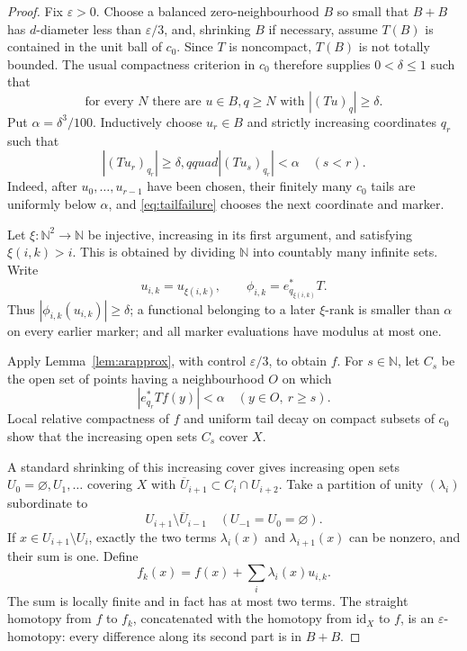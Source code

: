 \documentclass[11pt]{article}
\newcommand{\N}{\mathbb N}
\newcommand{\id}{\mathrm{id}}
\begin{document}
\begin{proof}
Fix $\varepsilon>0$.  Choose a balanced zero-neighbourhood $B$ so small that
$B+B$ has $d$-diameter less than $\varepsilon/3$, and, shrinking $B$ if
necessary, assume $T(B)$ is contained in the unit ball of $c_0$.  Since $T$
is noncompact, $T(B)$ is not totally bounded.  The usual compactness
criterion in $c_0$ therefore supplies $0<\delta\le1$ such that
\begin{equation}\label{eq:tailfailure}
 \text{for every }N\text{ there are }u\in B, q\ge N
 \text{ with } |(Tu)_q|\ge\delta.
\end{equation}
Put $\alpha=\delta^3/100$.  Inductively choose $u_r\in B$ and strictly
increasing coordinates $q_r$ such that
\begin{equation}\label{eq:markers}
 |(Tu_r)_{q_r}|\ge\delta,qquad
 |(Tu_s)_{q_r}|<\alpha\quad(s<r).
\end{equation}
Indeed, after $u_0,\ldots,u_{r-1}$ have been chosen, their finitely many
$c_0$ tails are uniformly below $\alpha$, and
\eqref{eq:tailfailure} chooses the next coordinate and marker.

Let $\xi:\N^2\to\N$ be injective, increasing in its first argument, and
satisfying $\xi(i,k)>i$.  This is obtained by dividing $\N$ into countably
many infinite sets.  Write
\[
 u_{i,k}=u_{\xi(i,k)},\qquad
 \phi_{i,k}=e^*_{q_{\xi(i,k)}}T.
\]
Thus $|\phi_{i,k}(u_{i,k})|\ge\delta$; a functional belonging to a later
$\xi$-rank is smaller than $\alpha$ on every earlier marker; and all marker
evaluations have modulus at most one.

Apply Lemma~\ref{lem:arapprox}, with control $\varepsilon/3$, to obtain $f$.
For $s\in\N$, let $C_s$ be the open set of points having a neighbourhood $O$
on which
\[
             |e^*_{q_r}Tf(y)|<\alpha
             \quad(y\in O,\ r\ge s).
\]
Local relative compactness of $f$ and uniform tail decay on compact subsets
of $c_0$ show that the increasing open sets $C_s$ cover $X$.

A standard shrinking of this increasing cover gives increasing open sets
$U_0=\varnothing,U_1,\ldots$ covering $X$ with
$\overline U_{i+1}\subset C_i\cap U_{i+2}$.  Take a partition of unity
$(\lambda_i)$ subordinate to
\[
                  U_{i+1}\setminus\overline U_{i-1}
                  \quad (U_{-1}=U_0=\varnothing).
\]
If $x\in U_{i+1}\setminus U_i$, exactly the two terms $\lambda_i(x)$ and
$\lambda_{i+1}(x)$ can be nonzero, and their sum is one.  Define
\begin{equation}\label{eq:fk}
 f_k(x)=f(x)+\sum_i\lambda_i(x)u_{i,k}.
\end{equation}
The sum is locally finite and in fact has at most two terms.  The straight
homotopy from $f$ to $f_k$, concatenated with the homotopy from $\id_X$ to
$f$, is an $\varepsilon$-homotopy: every difference along its second part is
in $B+B$.


\end{proof}
\end{document}
